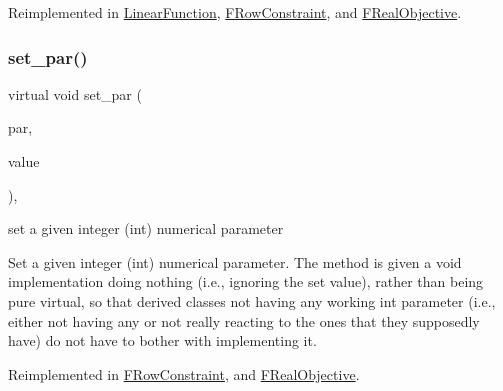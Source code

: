 Reimplemented in \mbox{\hyperlink{class_s_m_spp__di__unipi__it_1_1_linear_function_af7a4779f8aa872d4a7ed3d2e0e62d29c}{Linear\+Function}}, \mbox{\hyperlink{class_s_m_spp__di__unipi__it_1_1_f_row_constraint_afca3d4682961381f16cb8e0b5b88e81e}{F\+Row\+Constraint}}, and \mbox{\hyperlink{class_s_m_spp__di__unipi__it_1_1_f_real_objective_afca3d4682961381f16cb8e0b5b88e81e}{F\+Real\+Objective}}.

\mbox{\label{class_s_m_spp__di__unipi__it_1_1_thin_compute_interface_a73669f587bb938b587c54ad7e73ec297}} 
\subsubsection{\texorpdfstring{set\+\_\+par()}{set\_par()}\hspace{0.1cm}{\footnotesize\ttfamily [1/3]}}
{\footnotesize\ttfamily virtual void set\+\_\+par (\begin{DoxyParamCaption}\item[{const \mbox{\hyperlink{class_s_m_spp__di__unipi__it_1_1_thin_compute_interface_aa3d710629ad8c434286726ad810c3b47}{idx\+\_\+type}}}]{par,  }\item[{const int}]{value }\end{DoxyParamCaption})\hspace{0.3cm}{\ttfamily [inline]}, {\ttfamily [virtual]}}



set a given integer (int) numerical parameter 

Set a given integer (int) numerical parameter. The method is given a void implementation doing nothing (i.\+e., ignoring the set value), rather than being pure virtual, so that derived classes not having any working int parameter (i.\+e., either not having any or not really reacting to the ones that they supposedly have) do not have to bother with implementing it. 

Reimplemented in \mbox{\hyperlink{class_s_m_spp__di__unipi__it_1_1_f_row_constraint_ab8ce512bc43533d07e9ebf93d44c515d}{F\+Row\+Constraint}}, and \mbox{\hyperlink{class_s_m_spp__di__unipi__it_1_1_f_real_objective_ab8ce512bc43533d07e9ebf93d44c515d}{F\+Real\+Objective}}.

